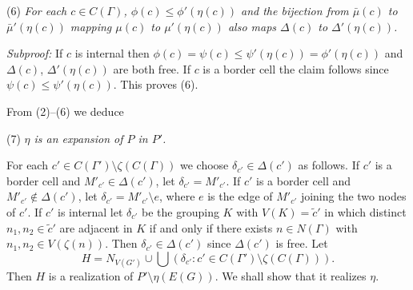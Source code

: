 \hspace*{12pt}(6) \textit{For each $c \in C(\Gamma)$, $\phi(c) \le \phi'(\eta(c))$ and the bijection from $\bar{\mu}(c)$ to $\bar{\mu}'(\eta(c))$ mapping $\mu(c)$ to $\mu'(\eta(c))$ also maps $\Delta(c)$ to $\Delta'(\eta(c))$.}

\textit{Subproof:} If $c$ is internal then $\phi(c) = \psi(c) \le \psi'(\eta(c)) = \phi'(\eta(c))$ and $\Delta(c)$, $\Delta'(\eta(c))$ are both free. If $c$ is a border cell the claim follows since $\psi(c) \le \psi'(\eta(c))$. This proves (6).

From (2)--(6) we deduce

\hspace*{12pt}(7) \textit{$\eta$ is an expansion of $P$ in $P'$.}

For each $c' \in C(\Gamma') \setminus \zeta(C(\Gamma))$ we choose $\delta_{c'} \in \Delta(c')$ as follows. If $c'$ is a border cell and $M'_{c'} \in \Delta(c')$, let $\delta_{c'} = M'_{c'}$. If $c'$ is a border cell and $M'_{c'} \notin \Delta(c')$, let $\delta_{c'} = M'_{c'} \setminus e$, where $e$ is the edge of $M'_{c'}$ joining the two nodes of $c'$. If $c'$ is internal let $\delta_{c'}$ be the grouping $K$ with $V(K) = \tilde{c}'$ in which distinct $n_1, n_2 \in \tilde{c}'$ are adjacent in $K$ if and only if there exists $n \in N(\Gamma)$ with $n_1, n_2 \in V(\zeta(n))$. Then $\delta_{c'} \in \Delta(c')$ since $\Delta(c')$ is free. Let
\begin{equation*}
H = N_{V(G')} \cup \bigcup (\delta_{c'} : c' \in C(\Gamma') \setminus \zeta(C(\Gamma))).
\end{equation*}
Then $H$ is a realization of $P' \setminus \eta(E(G))$. We shall show that it realizes $\eta$.
